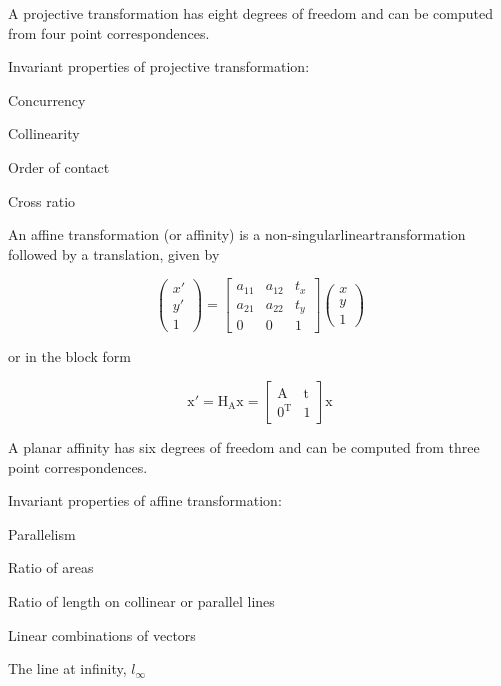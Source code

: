 \documentclass[conference]{IEEEtran}
\begin{document}
A projective transformation has eight degrees of freedom and can be computed from four point correspondences.

Invariant properties of projective transformation: 

\begin{description}[font=$\bullet$~\normalfont\scshape\color{red!50!black}]
  \item Concurrency
  \item Collinearity
  \item Order of contact
  \item Cross ratio
\end{description}

An affine transformation (or affinity) is a non-singularlineartransformation followed
by a translation, given by

\[ \begin{pmatrix} x{'}\\y{'}\\1 \end{pmatrix} = 
\begin{bmatrix}
a_{11} & a_{12} & t_{x}\\
a_{21} & a_{22} & t_{y}\\
0 & 0 & 1
\end{bmatrix}\begin{pmatrix} x\\y\\1 \end{pmatrix}
 \]
 
 or in the block form
 
 \[ \mathrm{x}{'} = \mathrm{H}_\mathrm{A}\mathrm{x} = 
 \begin{bmatrix}
\mathrm{A}& \mathrm{t} \\
0^\mathrm{T} & 1
\end{bmatrix}\mathrm{x}
 \]
 
A planar affinity has six degrees of freedom and can be computed from three point correspondences.

Invariant properties of affine transformation: 

\begin{description}[font=$\bullet$~\normalfont\scshape\color{red!50!black}]
  \item Parallelism
  \item Ratio of areas
  \item Ratio of length on collinear or parallel lines
  \item Linear combinations of vectors
  \item The line at infinity, \( l_{\infty} \)
\end{description}
\end{document}
